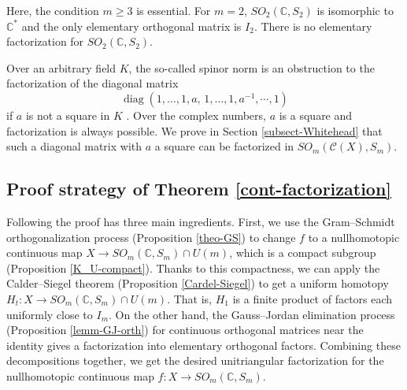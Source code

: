 \documentclass[11pt]{amsart}
\theoremstyle{definition}
\theoremstyle{remark}
\theoremstyle{remark}
\newcommand{\C}{\mathbb{C}}
\newcommand{\diag}{\operatorname{diag}}
\begin{document}
Here, the condition $m \geq 3$ is essential. For $m=2$, $SO_2(\mathbb C,S_2)$ is isomorphic to $\C^*$ and the only elementary orthogonal matrix is $I_2$. There is no elementary factorization for $SO_2(\mathbb C,S_2)$. 

Over an arbitrary field $K$, the so-called spinor norm is an obstruction to the factorization of the diagonal matrix 
$$           \diag(1,\dots,1,a,\,1,\dots,1,a^{-1},\cdots,1)
$$ 
if $a$ is not a square in $K$ \cite{MR0360645}. Over the complex numbers, $a$ is a square and factorization is always possible. We prove in Section \ref{subsect-Whitehead} that such a diagonal matrix with $a$ a square can be factorized in $SO_m(\mathcal{C}(X),S_m)$.  %

\subsection{Proof strategy of Theorem \ref{cont-factorization}} 

Following \cite{MR4078081} the proof has three main ingredients. First, we use the Gram--Schmidt orthogonalization process (Proposition \ref{theo-GS}) to change $f$ to a nullhomotopic continuous map $X \to SO_{m}(\mathbb{C}, S_m) \cap U(m)$, which is a compact subgroup (Proposition \ref{K_U-compact}). Thanks to this compactness, we can apply the Calder--Siegel theorem (Proposition \ref{Cardel-Siegel}) to get a uniform homotopy $H_t: X \to SO_{m}(\mathbb{C}, S_m) \cap U(m)$. That is, $H_1$ is a finite product of factors each uniformly close to $I_{m}$. On the other hand, the Gauss--Jordan elimination process (Proposition \ref{lemm-GJ-orth}) for continuous orthogonal matrices near the identity gives a factorization into elementary orthogonal factors. Combining these decompositions together, we get the desired unitriangular factorization for the nullhomotopic continuous map $f : X \to SO_{m}(\mathbb{C}, S_m)$. 
\end{document}
